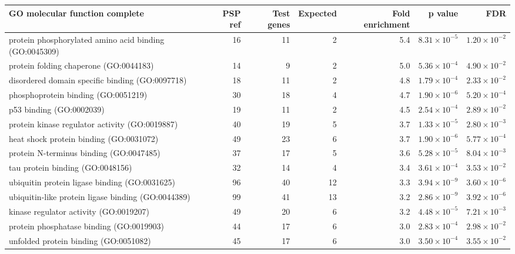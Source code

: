 \begin{table}[ht]
\centering
\begin{adjustbox}{width=\textwidth}


\begin{tabular}{lrrrrrr}
  \hline
GO molecular function complete & PSP ref & Test genes & Expected & Fold enrichment & p value & FDR \\ 
  \hline
protein phosphorylated amino acid binding (GO:0045309) & 16 & 11 & 2 & 5.4 & $8.31 \times 10^{-5}$ & $1.20 \times 10^{-2}$ \\ 
  protein folding chaperone (GO:0044183) & 14 & 9 & 2 & 5.0 & $5.36 \times 10^{-4}$ & $4.90 \times 10^{-2}$ \\ 
  disordered domain specific binding (GO:0097718) & 18 & 11 & 2 & 4.8 & $1.79 \times 10^{-4}$ & $2.33 \times 10^{-2}$ \\ 
  phosphoprotein binding (GO:0051219) & 30 & 18 & 4 & 4.7 & $1.90 \times 10^{-6}$ & $5.20 \times 10^{-4}$ \\ 
  p53 binding (GO:0002039) & 19 & 11 & 2 & 4.5 & $2.54 \times 10^{-4}$ & $2.89 \times 10^{-2}$ \\ 
  protein kinase regulator activity (GO:0019887) & 40 & 19 & 5 & 3.7 & $1.33 \times 10^{-5}$ & $2.80 \times 10^{-3}$ \\ 
  heat shock protein binding (GO:0031072) & 49 & 23 & 6 & 3.7 & $1.90 \times 10^{-6}$ & $5.77 \times 10^{-4}$ \\ 
  protein N-terminus binding (GO:0047485) & 37 & 17 & 5 & 3.6 & $5.28 \times 10^{-5}$ & $8.04 \times 10^{-3}$ \\ 
  tau protein binding (GO:0048156) & 32 & 14 & 4 & 3.4 & $3.61 \times 10^{-4}$ & $3.53 \times 10^{-2}$ \\ 
  ubiquitin protein ligase binding (GO:0031625) & 96 & 40 & 12 & 3.3 & $3.94 \times 10^{-9}$ & $3.60 \times 10^{-6}$ \\ 
  ubiquitin-like protein ligase binding (GO:0044389) & 99 & 41 & 13 & 3.2 & $2.86 \times 10^{-9}$ & $3.92 \times 10^{-6}$ \\ 
  kinase regulator activity (GO:0019207) & 49 & 20 & 6 & 3.2 & $4.48 \times 10^{-5}$ & $7.21 \times 10^{-3}$ \\ 
  protein phosphatase binding (GO:0019903) & 44 & 17 & 6 & 3.0 & $2.83 \times 10^{-4}$ & $2.98 \times 10^{-2}$ \\ 
  unfolded protein binding (GO:0051082) & 45 & 17 & 6 & 3.0 & $3.50 \times 10^{-4}$ & $3.55 \times 10^{-2}$ \\ 

\end{tabular}
\end{adjustbox}
\end{table}
